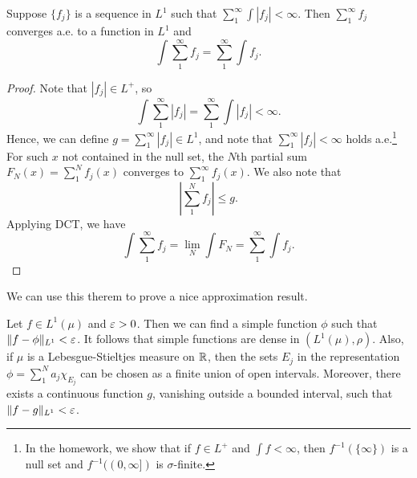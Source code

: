 \documentclass[12pt]{article} %
\begin{document}
\begin{theorem}
    Suppose $\{f_j\}$ is a sequence in $L^1$ such that $\sum_1^\infty \int |f_j| < \infty$. Then $\sum_1^\infty f_j$ converges a.e. to a function in $L^1$ and \[\int \sum_1^\infty f_j = \sum_1^\infty \int f_j.\]
\end{theorem}

\begin{proof}
    Note that $|f_j| \in L^+$, so \[\int \sum_1^\infty |f_j| = \sum_1^\infty \int |f_j| < \infty.\] Hence, we can define $g = \sum_1^\infty |f_j| \in L^1$, and note that $\sum_1^\infty |f_j| < \infty$ holds a.e.\footnote{In the homework, we show that if $f \in L^+$ and $\int f < \infty$, then $f^{-1}(\{\infty\})$ is a null set and $f^{-1}((0, \infty])$ is $\sigma$-finite.} For such $x$ not contained in the null set, the $N$th partial sum $F_N(x) = \sum_1^N f_j(x)$ converges to $\sum_1^\infty f_j(x)$. We also note that \[\left|\sum_1^N f_j \right| \leq g.\] Applying DCT, we have \[\int \sum_1^\infty f_j = \lim_N \int F_N = \sum_1^\infty \int f_j.\]
\end{proof}

We can use this therem to prove a nice approximation result.

\begin{theorem}
    Let $f \in L^1(\mu)$ and $\varepsilon > 0$. Then we can find a simple function $\phi$ such that $\|f - \phi\|_{L^1} < \varepsilon$. It follows that simple functions are dense in $(L^1(\mu), \rho)$. Also, if $\mu$ is a Lebesgue-Stieltjes measure on $\mathbb{R}$, then the sets $E_j$ in the representation $\phi = \sum_1^N a_j \chi_{E_j}$ can be chosen as a finite union of open intervals. Moreover, there exists a continuous function $g$, vanishing outside a bounded interval, such that $\|f - g\|_{L^1} < \varepsilon$.
\end{theorem}
\end{document}
